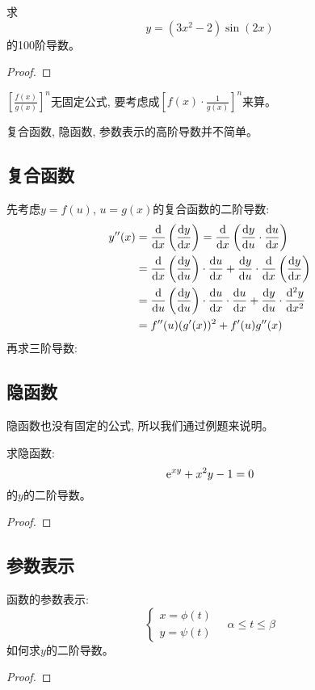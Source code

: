 \begin{example}
    求
    \begin{equation*}
        y = (3x^2-2)\sin(2x)
    \end{equation*}
    的100阶导数。
\end{example}
\begin{proof}
    
\end{proof}

$\left[\frac{f(x)}{g(x)}\right]^{n}$无固定公式, 要考虑成$\left[f(x)\cdot\frac{1}{g(x)}\right]^{n}$来算。

复合函数, 隐函数, 参数表示的高阶导数并不简单。
\subsection{复合函数}
先考虑$y = f(u)$, $u = g(x)$的复合函数的二阶导数:
\begin{equation*}
    \begin{aligned}
        y''(x) &= \frac{\mathrm{d} }{\mathrm{d} x} \left( \frac{\mathrm{d} y}{\mathrm{d} x}\right) = \frac{\mathrm{d} }{\mathrm{d} x} \left( \frac{\mathrm{d} y}{\mathrm{d} u} \cdot \frac{\mathrm{d} u}{\mathrm{d} x}\right) \\
        &= \frac{\mathrm{d} }{\mathrm{d} x}\left(\frac{\mathrm{d} y}{\mathrm{d} u}\right)\cdot\frac{\mathrm{d} u}{\mathrm{d} x} + \frac{\mathrm{d} y}{\mathrm{d} u}\cdot\frac{\mathrm{d} }{\mathrm{d} x}\left( \frac{\mathrm{d} y}{\mathrm{d} x}\right) \\ 
        &= \frac{\mathrm{d} }{\mathrm{d} u}\left(\frac{\mathrm{d} y}{\mathrm{d} u}\right)\cdot\frac{\mathrm{d} u}{\mathrm{d} x}\cdot\frac{\mathrm{d} u}{\mathrm{d} x} + \frac{\mathrm{d} y}{\mathrm{d} u}\cdot\frac{\mathrm{d}^2 y}{\mathrm{d} x^2} \\
        &= f''(u)(g'(x))^2+f'(u)g''(x)
    \end{aligned}
\end{equation*}
再求三阶导数:

\subsection{隐函数}
隐函数也没有固定的公式, 所以我们通过例题来说明。
\begin{example}
    求隐函数:
    \begin{equation*}
        \mathrm{e}^{xy}+x^2y-1 = 0
    \end{equation*}
    的$y$的二阶导数。
\end{example}
\begin{proof}
    
\end{proof}

\subsection{参数表示}
\begin{problem}
函数的参数表示:
    \begin{equation*}
        \left\{
            \begin{aligned}
                x = \phi(t) \\
                y = \psi(t)
            \end{aligned}
        \right.
        \quad \alpha \le t \le \beta
    \end{equation*}
    如何求$y$的二阶导数。    
\end{problem}
\begin{proof}
    
\end{proof}

